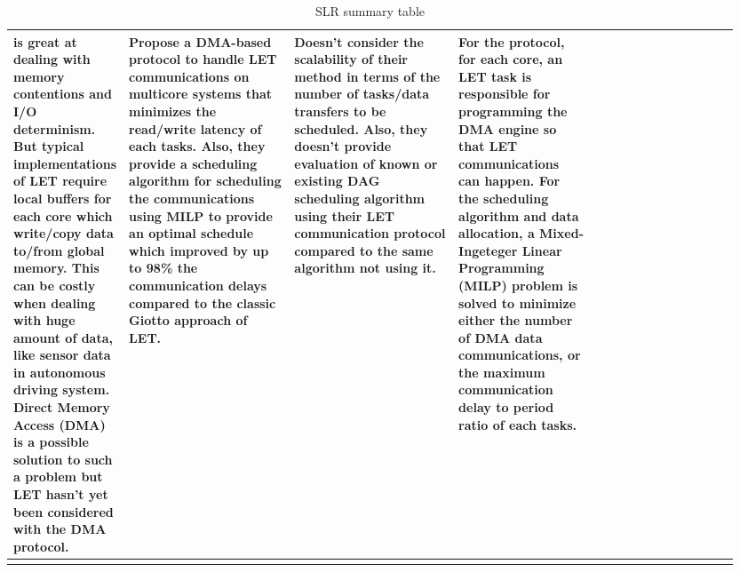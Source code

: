 \documentclass{article}
\begin{document}
\begin{longtable}{|l|p{0.25\linewidth}|p{0.25\linewidth}|p{0.20\linewidth}|p{0.25\linewidth}|}
        is great at dealing with memory contentions 
        and I/O determinism.
        But typical implementations of LET 
        require local buffers for each core which write/copy data to/from
        global memory. This can be costly when dealing 
        with huge amount of data, like sensor data in autonomous driving system.
        Direct Memory Access (DMA) is a possible solution to such a problem
        but LET hasn't yet been considered with the DMA protocol. &
        Propose a DMA-based protocol to handle LET communications
        on multicore systems that minimizes the read/write latency of each tasks.
        Also, they provide a scheduling algorithm for scheduling the communications
        using MILP to provide an optimal schedule
        which improved by up to 98\% the communication delays compared
        to the classic Giotto approach of LET. & Doesn't consider 
        the scalability of their method in terms of the number of tasks/data transfers to be scheduled. 
        Also, they doesn't provide
        evaluation of known or existing DAG scheduling algorithm
        using their LET communication protocol compared to the same algorithm not using it.
        & For the protocol, for each core, an LET task is responsible for 
        programming the DMA engine so that LET communications can happen.
        For the scheduling algorithm and data allocation,
        a Mixed-Ingeteger Linear Programming (MILP) problem 
        is solved to minimize either the number of DMA data communications,
        or the maximum communication delay to period ratio of each tasks.  \\
        \hline
    \caption{SLR summary table}
    \label{tab:slt_sum_table}
\end{longtable}


\printbibliography
\end{document}

